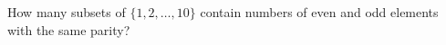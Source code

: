 How many subsets of $\{1,2,\ldots,10\}$ contain numbers of even and odd elements with the same parity?
